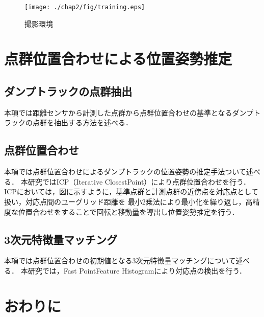 \begin{figure}[b]
    \begin{center}
    \texttt{[image: ./chap2/fig/training.eps]}
    \caption{撮影環境}
    \label{fig:train}
    \end{center}
\end{figure}
\newpage

\section{点群位置合わせによる位置姿勢推定}
\subsection{ダンプトラックの点群抽出}
本項では距離センサから計測した点群から点群位置合わせの基準となるダンプトラックの点群を抽出する方法を述べる．

\newpage

\subsection{点群位置合わせ}
本項では点群位置合わせによるダンプトラックの位置姿勢の推定手法ついて述べる．
本研究ではICP（Iterative ClosestPoint）により点群位置合わせを行う．
ICPにおいては，図に示すように，基準点群と計測点群の近傍点を対応点として扱い，対応点間のユーグリッド距離を
最小2乗法により最小化を繰り返し，高精度な位置合わせをすることで回転と移動量を導出し位置姿勢推定を行う．


\newpage

\subsection{3次元特徴量マッチング}
本項では点群位置合わせの初期値となる3次元特徴量マッチングについて述べる．
本研究では，Fast PointFeature Histogramにより対応点の検出を行う．
\newpage

\section{おわりに}

\newpage